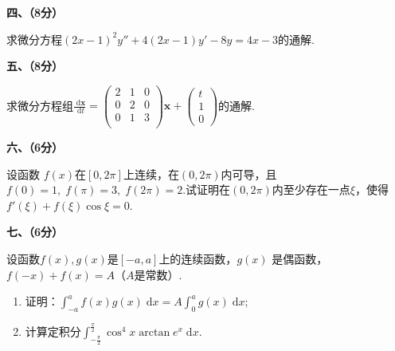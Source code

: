 \documentclass[11pt,a4paper]{ctexart}
\def\d{\,\mathrm{d}}
\def\d{\;\mathrm{d}}
\begin{document}
\begin{framed}
	\begin{large}
       \noindent\textbf{四、（8分）}
	\end{large}
	求微分方程\((2x - 1)^2 y'' + 4(2x - 1)y' - 8y = 4x - 3\)的通解.\[\] \[\]\[\]\[\]\[\]\[\]\[\]\[\]\[\]\[\]

	\begin{large}
		\noindent\textbf{五、（8分）}
	\end{large}
	求微分方程组\(\displaystyle \frac{\d\boldsymbol{x}}{\d t} = \begin{pmatrix}
		2 & 1 & 0 \\ 0 & 2 & 0 \\ 0 & 1 & 3 \\
	\end{pmatrix}\boldsymbol{x} + \begin{pmatrix}
		t\\1\\0
	\end{pmatrix}\)的通解.\[\] \[\]\[\]\[\]\[\]\[\]\[\]\[\]\[\]\[\]

	\begin{large}
		\noindent\textbf{六、（6分）}
	\end{large}
	设函数	\(f(x)\)在\([0, 2 \pi]\)上连续，在\((0, 2\pi)\)内可导，且\(f(0) = 1,\; f(\pi) = 3,\; f(2\pi)  = 2\).试证明在\((0, 2\pi)\)内至少存在一点\(\xi\)，使得\(f'(\xi) + f(\xi) \cos \xi = 0.\)\[\] \[\]\[\]\[\]\[\]\[\]\[\]\[\]\[\]\[\]

	\begin{large}
		\noindent\textbf{七、（6分）}
	\end{large}
	设函数\(f(x), g(x)\)是\([-a, a]\)上的连续函数，\(g(x)\)	是偶函数，\(f(-x) + f(x) = A\)（\(A\)是常数）.\begin{enumerate}[(1)]
		\item 证明：\(\displaystyle \int_{-a}^a f(x) g(x) \d x = A \int_0^a g(x) \d x\);
		\item 计算定积分\(\displaystyle \int_{-\frac{\pi}{2}}^{\frac{\pi}{2}} \cos^4x \arctan e^x \d x.\)
	\end{enumerate}
	\[\] \[\]\[\]\[\]\[\]\[\]	\[\] \[\]\[\]\[\]\[\]\[\]

	
	
    

    
    \end{framed}
  
\end{document}
